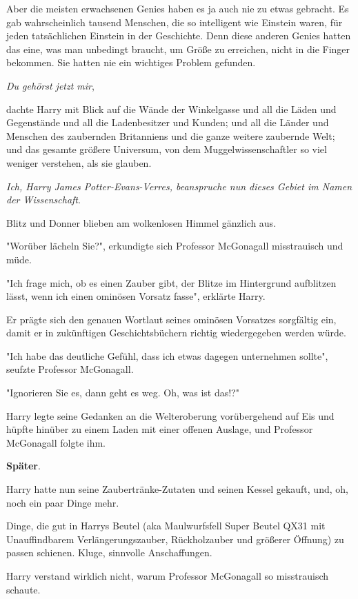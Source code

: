 {Aber die meisten erwachsenen Genies haben es ja auch nie zu etwas gebracht. Es gab wahrscheinlich tausend Menschen, die so intelligent wie Einstein waren, für jeden tatsächlichen Einstein in der Geschichte. Denn diese anderen Genies hatten das eine, was man unbedingt braucht, um Größe zu erreichen, nicht in die Finger bekommen. Sie hatten nie ein wichtiges Problem gefunden.

\emph{Du gehörst jetzt mir},

dachte Harry mit Blick auf die Wände der Winkelgasse und all die Läden und Gegenstände und all die Ladenbesitzer und Kunden; und all die Länder und Menschen des zaubernden Britanniens und die ganze weitere zaubernde Welt; und das gesamte größere Universum, von dem Muggelwissenschaftler so viel weniger verstehen, als sie glauben.

\emph{Ich, Harry James Potter-Evans-Verres, beanspruche nun dieses Gebiet im Namen der Wissenschaft}.

Blitz und Donner blieben am wolkenlosen Himmel gänzlich aus.

"Worüber lächeln Sie?", erkundigte sich Professor McGonagall misstrauisch und müde.

"Ich frage mich, ob es einen Zauber gibt, der Blitze im Hintergrund aufblitzen lässt, wenn ich einen ominösen Vorsatz fasse", erklärte Harry.

Er prägte sich den genauen Wortlaut seines ominösen Vorsatzes sorgfältig ein, damit er in zukünftigen Geschichtsbüchern richtig wiedergegeben werden würde.

"Ich habe das deutliche Gefühl, dass ich etwas dagegen unternehmen sollte", seufzte Professor McGonagall.

"Ignorieren Sie es, dann geht es weg. Oh, was ist das!?"

Harry legte seine Gedanken an die Welteroberung vorübergehend auf Eis und hüpfte hinüber zu einem Laden mit einer offenen Auslage, und Professor McGonagall folgte ihm.

\textbf{Später}.

Harry hatte nun seine Zaubertränke-Zutaten und seinen Kessel gekauft, und, oh, noch ein paar Dinge mehr.

Dinge, die gut in Harrys Beutel (aka Maulwurfsfell Super Beutel QX31 mit Unauffindbarem Verlängerungszauber, Rückholzauber und größerer Öffnung) zu passen schienen. Kluge, sinnvolle Anschaffungen.

Harry verstand wirklich nicht, warum Professor McGonagall so misstrauisch schaute.

}
